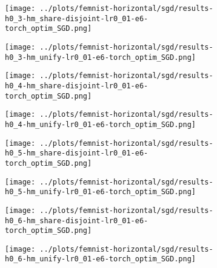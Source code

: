 \begin{figure}[htbp]  %
    \centering
    \begin{subfigure}[b]{0.47\textwidth}
        \centering
        \texttt{[image: ../plots/femnist-horizontal/sgd/results-h0\_3-hm\_share-disjoint-lr0\_01-e6-torch\_optim\_SGD.png]}
    \end{subfigure}
    \hfill
    \begin{subfigure}[b]{0.47\textwidth}
        \centering
        \texttt{[image: ../plots/femnist-horizontal/sgd/results-h0\_3-hm\_unify-lr0\_01-e6-torch\_optim\_SGD.png]}
    \end{subfigure}
\end{figure}
\begin{figure}[htbp]  %
    \centering
    \begin{subfigure}[b]{0.47\textwidth}
        \centering
        \texttt{[image: ../plots/femnist-horizontal/sgd/results-h0\_4-hm\_share-disjoint-lr0\_01-e6-torch\_optim\_SGD.png]}
    \end{subfigure}
    \hfill
    \begin{subfigure}[b]{0.47\textwidth}
        \centering
        \texttt{[image: ../plots/femnist-horizontal/sgd/results-h0\_4-hm\_unify-lr0\_01-e6-torch\_optim\_SGD.png]}
    \end{subfigure}
\end{figure}
\begin{figure}[htbp]  %
    \centering
    \begin{subfigure}[b]{0.47\textwidth}
        \centering
        \texttt{[image: ../plots/femnist-horizontal/sgd/results-h0\_5-hm\_share-disjoint-lr0\_01-e6-torch\_optim\_SGD.png]}
    \end{subfigure}
    \hfill
    \begin{subfigure}[b]{0.47\textwidth}
        \centering
        \texttt{[image: ../plots/femnist-horizontal/sgd/results-h0\_5-hm\_unify-lr0\_01-e6-torch\_optim\_SGD.png]}
    \end{subfigure}
\end{figure}
\begin{figure}[htbp]  %
    \centering
    \begin{subfigure}[b]{0.47\textwidth}
        \centering
        \texttt{[image: ../plots/femnist-horizontal/sgd/results-h0\_6-hm\_share-disjoint-lr0\_01-e6-torch\_optim\_SGD.png]}
    \end{subfigure}
    \hfill
    \begin{subfigure}[b]{0.47\textwidth}
        \centering
        \texttt{[image: ../plots/femnist-horizontal/sgd/results-h0\_6-hm\_unify-lr0\_01-e6-torch\_optim\_SGD.png]}
    \end{subfigure}
\end{figure}
